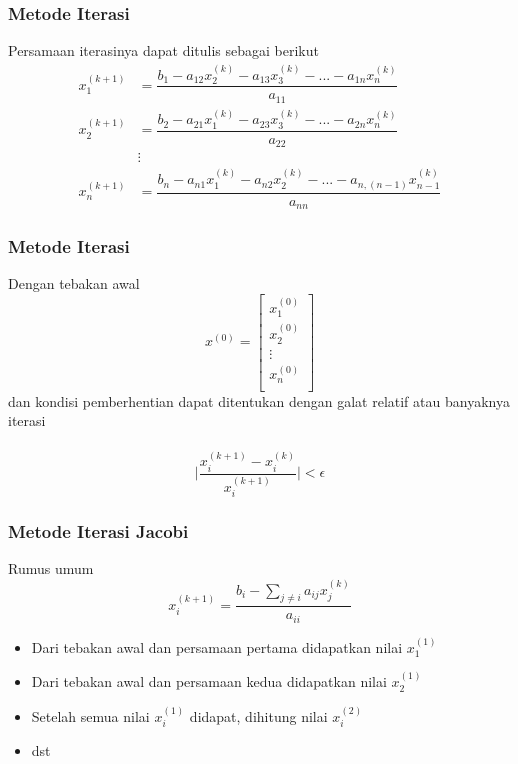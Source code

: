 \documentclass{beamer}
\begin{document}

\begin{frame}
\frametitle{Metode Iterasi}
Persamaan iterasinya dapat ditulis sebagai berikut
\begin{equation}
\begin{split}
x_1^{(k+1)} &=\dfrac{b_1-a_{12}x_2^{(k)}-a_{13}x_3^{(k)}-...-a_{1n}x_n^{(k)}}{a_{11}}
\\x_2^{(k+1)} &=\dfrac{b_2-a_{21}x_1^{(k)}-a_{23}x_3^{(k)}-...-a_{2n}x_n^{(k)}}{a_{22}}
\\&\vdots
\\x_n^{(k+1)} &=\dfrac{b_n-a_{n1}x_1^{(k)}-a_{n2}x_2^{(k)}-...-a_{n,(n-1)}x_{n-1}^{(k)}}{a_{nn}}
\end{split}
\nonumber
\end{equation}
\end{frame}


\begin{frame}
\frametitle{Metode Iterasi}
Dengan tebakan awal 
\begin{equation}
x^{(0)}=\begin{bmatrix}
	x_1^{(0)}\\
	x_2^{(0)}\\
	\vdots\\
	x_n^{(0)}\\
\end{bmatrix}
\nonumber
\end{equation}
dan kondisi pemberhentian dapat ditentukan dengan galat relatif atau banyaknya iterasi\\\ 
\begin{equation}
\Biggl| \dfrac{x_i^{(k+1)}-x_i^{(k)}}{x_i^{(k+1)}}\Biggr| < \epsilon
\nonumber
\end{equation}

\end{frame}


\begin{frame}
\frametitle{Metode Iterasi Jacobi}
Rumus umum
\begin{equation}
x_i^{(k+1)}=\dfrac{b_i-\sum_{j\neq i}a_{ij}x_j^{(k)}}{a_{ii}}
\nonumber
\end{equation}
\begin{itemize}
\item Dari tebakan awal dan persamaan pertama didapatkan nilai $x_1^{(1)}$
\item Dari tebakan awal dan persamaan kedua didapatkan nilai $x_2^{(1)}$
\item Setelah semua nilai $x_i^{(1)}$ didapat, dihitung nilai $x_i^{(2)}$
\item dst
\end{itemize}
\end{frame}
\end{document}
